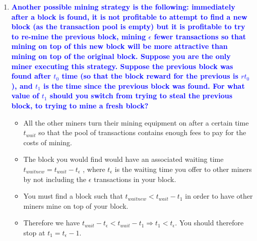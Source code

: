 \documentclass[11pt]{article}
\begin{document}
\begin{enumerate}
\begin{enumerate}
    \item \textbf{\textcolor{blue}{Another possible mining strategy is the following: immediately after a block is found, it is not profitable to attempt to find a new block (as the transaction pool is empty) but it is profitable to try to re-mine the previous block, mining $\epsilon$ fewer transactions so that mining on top of this new block will be more attractive than mining on top of the original block. Suppose you are the only miner executing this strategy. Suppose the previous block was found after $t_0$ time (so that the block reward for the previous is $rt_0$), and $t_1$ is the time since the previous block was found. For what value of $t_1$ should you switch from trying to steal the previous block, to trying to mine a fresh block?}}
        \begin{itemize}
            \item All the other miners turn their mining equipment on after a certain time $t_{wait}$ so that the pool of transactions contains enough fees to pay for the costs of mining.
            \item The block you would find would have an associated waiting time $t_{waitnew} = t_{wait} - t_{\epsilon}$ , where $t_{\epsilon}$ is the waiting time you offer to other miners by not including the $\epsilon$ transactions in your block.
            \item You must find a block such that $t_{waitnew} < t_{wait} - t_1$ in order to have other miners mine on top of your block.
            \item Therefore we have $t_{wait} - t_{\epsilon} < t_{wait} - t_1 \Rightarrow t_1 < t_{\epsilon}$. You should therefore stop at $t_1 = t_{\epsilon} - 1$. 
        \end{itemize}
    \end{enumerate}


\end{enumerate}
\end{document}
